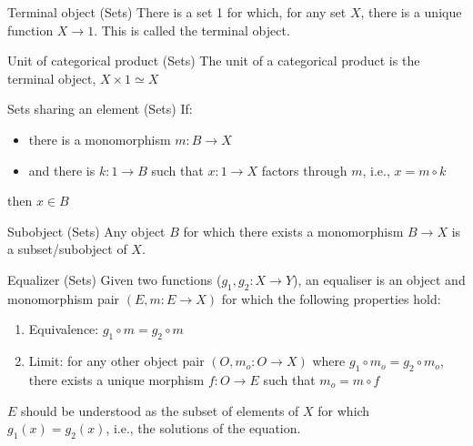 \documentclass[presentation]{beamer}
\begin{document}
\begin{frame}[label={sec:orgae1335a}]{Terminal object (Sets)}
There is a set 1 for which, for any set \(X\), there is a unique function \(X \rightarrow 1\).
This is called the \alert{terminal object}.
\end{frame}

\begin{frame}[label={sec:orgcfe1229}]{Unit of categorical product (Sets)}
The unit of a categorical product is the terminal object, \(X \times 1 \simeq X\)
\end{frame}

\begin{frame}[label={sec:org844b998}]{Sets sharing an element (Sets)}
If:

\begin{itemize}
\item there is a monomorphism \(m: B \rightarrow X\)

\item and there is \(k: 1 \rightarrow B\) such that \(x: 1 \rightarrow X\) factors through \(m\), i.e.,  \(x = m \circ k\)
\end{itemize}

then \(x \in B\)
\end{frame}

\begin{frame}[label={sec:org52da7bb}]{Subobject (Sets)}
Any object \(B\) for which there exists a monomorphism \(B \rightarrow X\) is a subset/subobject of \(X\).
\end{frame}

\begin{frame}[label={sec:orgdc37ba3}]{Equalizer (Sets)}
Given two functions (\(g_1, g_2: X \rightarrow Y\)), an equaliser is an \alert{object} and
\alert{monomorphism} \alert{pair} \((E,m: E \rightarrow X)\) for which the following
properties hold:

\begin{enumerate}
\item \alert{Equivalence}: \(g_1 \circ m = g_2 \circ m\)
\item \alert{Limit}: for any other object pair \((O,m_o: O \rightarrow X)\) where \(g_1 \circ
   m_o = g_2 \circ m_o\), there exists a unique morphism \(f: O \rightarrow E\) such
that \(m_o = m \circ f\)
\end{enumerate}

\(E\) should be understood as the subset of elements of \(X\) for which \(g_1(x) =
g_2(x)\), i.e., the solutions of the equation.
\end{frame}
\end{document}
